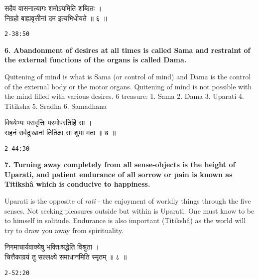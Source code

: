 \documentclass{article}
\begin{document}
\begin{large}
\begin{center}
    \begin{hindi}
	सदैव वासनात्यागः शमोऽयमिति शब्दितः ।\\
	निग्रहो बाह्यवृत्तीनां दम इत्यभिधीयते ॥ ६ ॥
    \end{hindi}
\end{center}
\end{large}
\texttt{2-38:50}

\textbf{6. Abandonment of desires at all times is called Sama and restraint
of the external functions of the organs is called Dama.
}

\begin{oframed}
Quitening of mind is what is Sama (or control of mind) and Dama is the control
of the external body or the motor organs. Quitening of mind is not possible
with the mind filled with various desires.
6 treasure: 
1. Sama
2. Dama
3. Uparati
4. Titiksha
5. Sradha
6. Samadhana
\end{oframed}

\begin{large}
\begin{center}
    \begin{hindi}
	विषयेभ्यः परावृत्तिः परमोपरतिर्हि सा ।\\
	सहनं सर्वदुःखानां तितिक्षा सा शुमा मता ॥ ७ ॥
    \end{hindi}
\end{center}
\end{large}
\texttt{2-44:30}

\textbf{
7. Turning away completely from all sense-objects is the height of Uparati,
and patient endurance of all sorrow or pain is known as Titikshâ which is
conducive to happiness.
}

\begin{oframed}
Uparati is the opposite of \textsl{rati} - the enjoyment of worldly things
through the five senses. Not seeking pleasures outside but within is Uparati.
One must know to be to himself in solitude. Endurance is also important
(Titikshâ) as the world will try to draw you away from spirituality.
\end{oframed}



\begin{large}
\begin{center}
    \begin{hindi}
	निगमाचार्यवाक्येषु भक्तिःश्रद्धेति विश्रुता ।\\
	चित्तैकाग्रयं तु सल्लक्ष्ये समाधानमिति स्मृतम् ॥ ८ ॥
    \end{hindi}
\end{center}
\end{large}
\texttt{2-52:20}
\end{document}
